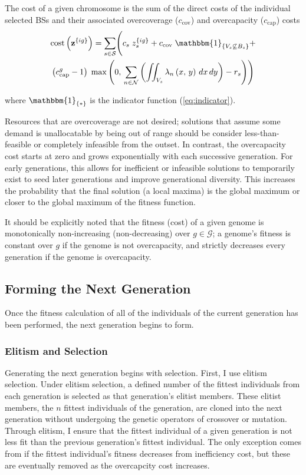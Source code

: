 \documentclass[12pt,dvipsnames]{report}
\newcommand{\ind}[1]{\mathbbm{1}_{\left\{ #1 \right\}}}
\begin{document}
The cost of a given chromosome is the sum of the direct costs of the individual selected BSs and their associated overcoverage ($c_{\text{cov}}$) and overcapacity ($c_{\text{cap}}$) costs
\begin{multline} \label{eq:GACost}
\mathrm{cost}\left( \textbf{z}^{\left\{ ig \right\}} \right) = \sum_{s \in \mathcal{S}} \Biggl( c_s \; z_s^{\left\{ ig \right\}} + c_\text{cov} \; \ind{V_s \not\subseteq B_s} + \\ \left( c_\text{cap}^g - 1 \right) \; \max\left( 0,\, \sum_{n \in \mathcal{N}} \left( \iint_{V_s} \lambda_n\left( x,\, y \right)\, dx\, dy \right) - r_s \right) \Biggr)
\end{multline}

\noindent where $\ind{*}$ is the indicator function (\cref{eq:indicator}).

Resources that are overcoverage are not desired; solutions that assume some demand is unallocatable by being out of range should be consider less-than-feasible or completely infeasible from the outset.  In contrast, the overcapacity cost starts at zero and grows exponentially with each successive generation.  For early generations, this allows for inefficient or infeasible solutions to temporarily exist to seed later generations and improve generational diversity.  This increases the probability that the final solution (a local maxima) is the global maximum or closer to the global maximum of the fitness function.

It should be explicitly noted that the fitness (cost) of a given genome is monotonically non-increasing (non-decreasing) over $g \in \mathcal{G}$; a genome's fitness is constant over $g$ if the genome is not overcapacity, and strictly decreases every generation if the genome is overcapacity.

\subsection{Forming the Next Generation} \label{subsec:ga_next}

Once the fitness calculation of all of the individuals of the current generation has been performed, the next generation begins to form.

\subsubsection{Elitism and Selection}

Generating the next generation begins with selection.  First, I use elitism selection.  Under elitism selection, a defined number of the fittest individuals from each generation is selected as that generation's elitist members.  These elitist members, the $n$ fittest individuals of the generation, are cloned into the next generation without undergoing the genetic operators of crossover or mutation.  Through elitism, I ensure that the fittest individual of a given generation is not less fit than the previous generation's fittest individual.  The only exception comes from if the fittest individual's fitness decreases from inefficiency cost, but these are eventually removed as the overcapcity cost increases.
\end{document}
